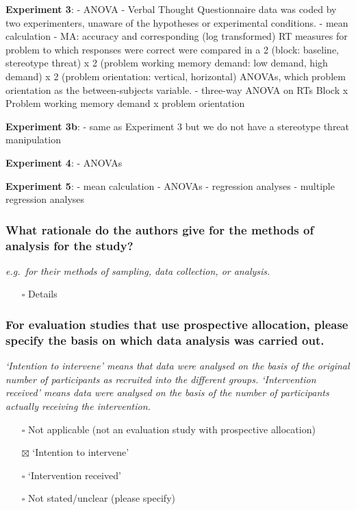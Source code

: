 \documentclass[
  doc, a4paper]{apa7}
\providecommand{\tightlist}{%
  \setlength{\itemsep}{0pt}\setlength{\parskip}{0pt}}
\begin{document}
\textbf{Experiment 3}:
- ANOVA
- Verbal Thought Questionnaire data was coded by two experimenters, unaware of the hypotheses or experimental conditions.
- mean calculation
- MA: accuracy and corresponding (log transformed) RT measures for problem to which responses were correct were compared in a 2 (block: baseline, stereotype threat) x 2 (problem working memory demand: low demand, high demand) x 2 (problem orientation: vertical, horizontal) ANOVAs, which problem orientation as the between-subjects variable.
- three-way ANOVA on RTs Block x Problem working memory demand x problem orientation

\textbf{Experiment 3b}:
- same as Experiment 3 but we do not have a stereotype threat manipulation

\textbf{Experiment 4}:
- ANOVAs

\textbf{Experiment 5}:
- mean calculation
- ANOVAs
- regression analyses
- multiple regression analyses

\subsubsection{What rationale do the authors give for the methods of analysis for the study?}\label{what-rationale-do-the-authors-give-for-the-methods-of-analysis-for-the-study}

\emph{e.g.~for their methods of sampling, data collection, or analysis.}

\begin{itemize}
\tightlist
\item[$\square$]
  Details
\end{itemize}

\subsubsection{For evaluation studies that use prospective allocation, please specify the basis on which data analysis was carried out.}\label{for-evaluation-studies-that-use-prospective-allocation-please-specify-the-basis-on-which-data-analysis-was-carried-out.}

\emph{`Intention to intervene' means that data were analysed on the basis of the original number of participants as recruited into the different groups. `Intervention received' means data were analysed on the basis of the number of participants actually receiving the intervention.}

\begin{itemize}
\tightlist
\item[$\square$]
  Not applicable (not an evaluation study with prospective allocation)
\item[$\boxtimes$]
  `Intention to intervene'
\item[$\square$]
  `Intervention received'
\item[$\square$]
  Not stated/unclear (please specify)
\end{itemize}
\end{document}
